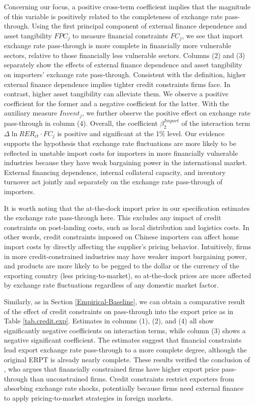 \documentclass[12pt]{article}
\begin{document}
Concerning our focus, a positive cross-term coefficient implies that the magnitude of this variable is positively related to the completeness of exchange rate pass-through. Using the first principal component of external finance dependence and asset tangibility $FPC_j$ to measure financial constraints $FC_j$, we see that import exchange rate pass-through is more complete in financially more vulnerable sectors, relative to those financially less vulnerable sectors. Columns (2) and (3) separately show the effects of external finance dependence and asset tangibility on importers' exchange rate pass-through. Consistent with the definition, higher external finance dependence implies tighter credit constraints firms face. In contrast, higher asset tangibility can alleviate them. We observe a positive coefficient for the former and a negative coefficient for the latter. With the auxiliary measure $Invent_j$, we further observe the positive effect on exchange rate pass-through in column (4). Overall, the coefficient $\beta^{Import}_2$ of the interaction term $\Delta \ln RER_{ct} \cdot FC_{j}$ is positive and significant at the 1\% level. Our evidence supports the hypothesis that exchange rate fluctuations are more likely to be reflected in unstable import costs for importers in more financially vulnerable industries because they have weak bargaining power in the international market. External financing dependence, internal collateral capacity, and inventory turnover act jointly and separately on the exchange rate pass-through of importers.

It is worth noting that the at-the-dock import price in our specification estimates the exchange rate pass-through here. This excludes any impact of credit constraints on post-landing costs, such as local distribution and logistics costs. In other words, credit constraints imposed on Chinese importers can affect home import costs by directly affecting the supplier's pricing behavior. Intuitively, firms in more credit-constrained industries may have weaker import bargaining power, and products are more likely to be pegged to the dollar or the currency of the exporting country (less pricing-to-market), so at-the-dock prices are more affected by exchange rate fluctuations regardless of any domestic market factor.

Similarly, as in Section \ref{Empirical-Baseline}, we can obtain a comparative result of the effect of credit constraints on pass-through into the export price as in Table \ref{tab.credit.exp}. Estimates in columns (1), (2), and (4) all show significantly negative coefficients on interaction terms, while column (3) shows a negative significant coefficient. The estimates suggest that financial constraints lead export exchange rate pass-through to a more complete degree, although the original ERPT is already nearly complete. These results verified the conclusion of \cite{strasser2013}, who argues that financially constrained firms have higher export price pass-through than unconstrained firms. Credit constraints restrict exporters from absorbing exchange rate shocks, potentially because firms need external finance to apply pricing-to-market strategies in foreign markets.
\end{document}
